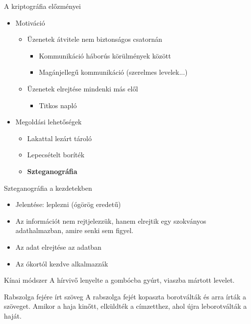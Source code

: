 \documentclass[12 pt]{beamer}
\begin{document}

\begin{frame}{A kriptográfia előzményei}
  \begin{itemize}
    \item{Motiváció}
      \begin{itemize}
        \item{Üzenetek átvitele nem biztonságos csatornán}
          \begin{itemize}
            \item{Kommunikáció háborús körülmények között}
            \item{Magánjellegű kommunikáció (szerelmes levelek...)}
          \end{itemize}
        \item{Üzenetek elrejtése mindenki más elől}
          \begin{itemize}
            \item{Titkos napló}
          \end{itemize}
      \end{itemize}

    \item{Megoldási lehetőségek}
      \begin{itemize}
        \item{Lakattal lezárt tároló}
        \item{Lepecsételt boríték}
        \item{\textbf{Szteganográfia}}
      \end{itemize}
  \end{itemize}
\end{frame}


\begin{frame}{Szteganográfia a kezdetekben}
  \begin{itemize}
    \item{Jelentése: leplezni (ógörög eredetű)}
    \item{Az információt nem rejtjelezzük, hanem elrejtik egy szokványos adathalmazban, amire senki sem figyel.}
    \item{Az adat elrejtése az adatban}
    \item{Az ókortól kezdve alkalmazzák}
  \end{itemize}

  \begin{block}{Kínai módszer}
    A hírvivő lenyelte a gombócba gyúrt, viaszba mártott levelet.
  \end{block}

  \begin{block}{Rabszolga fejére írt szöveg}
    A rabszolga fejét kopaszta borotválták és arra írták a szöveget. Amikor a haja kinőtt, elküldték a címzetthez, ahol újra leborotválták a haját.
  \end{block}

\end{frame}
\end{document}
